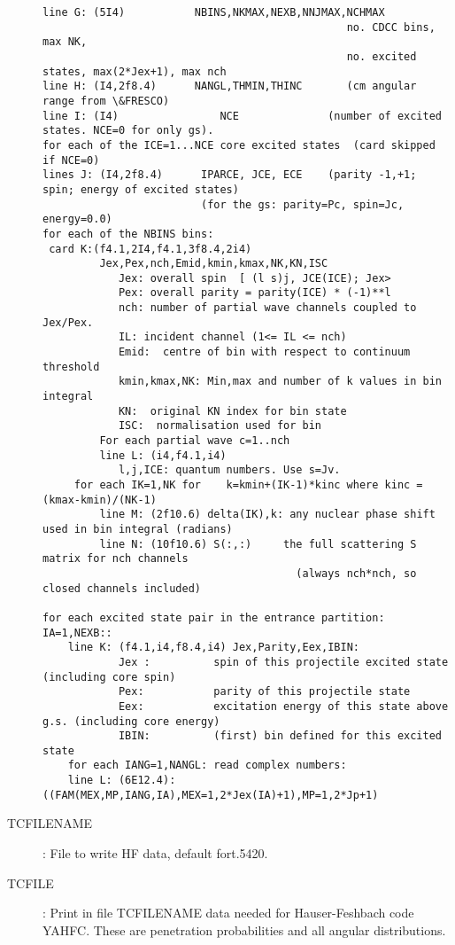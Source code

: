 \documentclass[11pt]{article}
\begin{document}
\begin{description}
{\begin{verbatim}
line G: (5I4)           NBINS,NKMAX,NEXB,NNJMAX,NCHMAX
                                                no. CDCC bins, max NK,
                                                no. excited states, max(2*Jex+1), max nch
line H: (I4,2f8.4)      NANGL,THMIN,THINC       (cm angular range from \&FRESCO)
line I: (I4)                NCE              (number of excited states. NCE=0 for only gs).
for each of the ICE=1...NCE core excited states  (card skipped if NCE=0)
lines J: (I4,2f8.4)      IPARCE, JCE, ECE    (parity -1,+1; spin; energy of excited states)
                         (for the gs: parity=Pc, spin=Jc, energy=0.0)
for each of the NBINS bins:
 card K:(f4.1,2I4,f4.1,3f8.4,2i4)
         Jex,Pex,nch,Emid,kmin,kmax,NK,KN,ISC
            Jex: overall spin  [ (l s)j, JCE(ICE); Jex>
            Pex: overall parity = parity(ICE) * (-1)**l
            nch: number of partial wave channels coupled to Jex/Pex.
            IL: incident channel (1<= IL <= nch)
            Emid:  centre of bin with respect to continuum threshold
            kmin,kmax,NK: Min,max and number of k values in bin integral
            KN:  original KN index for bin state
            ISC:  normalisation used for bin
         For each partial wave c=1..nch
         line L: (i4,f4.1,i4)
            l,j,ICE: quantum numbers. Use s=Jv.            
     for each IK=1,NK for    k=kmin+(IK-1)*kinc where kinc = (kmax-kmin)/(NK-1)
         line M: (2f10.6) delta(IK),k: any nuclear phase shift used in bin integral (radians)
         line N: (10f10.6) S(:,:)     the full scattering S matrix for nch channels 
                                        (always nch*nch, so closed channels included)

for each excited state pair in the entrance partition: IA=1,NEXB::
    line K: (f4.1,i4,f8.4,i4) Jex,Parity,Eex,IBIN:
            Jex :          spin of this projectile excited state (including core spin)
            Pex:           parity of this projectile state
            Eex:           excitation energy of this state above g.s. (including core energy)
            IBIN:          (first) bin defined for this excited state
    for each IANG=1,NANGL: read complex numbers:
    line L: (6E12.4): ((FAM(MEX,MP,IANG,IA),MEX=1,2*Jex(IA)+1),MP=1,2*Jp+1)
\end{verbatim}
}

\item[TCFILENAME]: 
File to write HF data, default fort.5420.

\item[TCFILE]: 
Print in file TCFILENAME data needed for Hauser-Feshbach code YAHFC. These are penetration probabilities and  all angular distributions.


\end{description}
\end{document}
